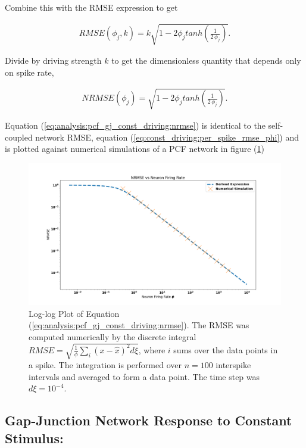 Combine this with the RMSE expression to get 

\begin{align*}
RMSE(\phi_j, k) = 
k \sqrt{
	1 - 2 \phi_j tanh \left(\frac{1}{2 \, \phi_j} \right)
}. 
\end{align*}

Divide by driving strength $k$ to get the dimensionless quantity that depends only on spike rate, 

\begin{align}
\label{eq:analysis:pcf_gj_const_driving:nrmse}
NRMSE(\phi_j) = 
\sqrt{
	1 - 2 \phi_j tanh \left(\frac{1}{2 \, \phi_j} \right)
}. 
\end{align}

Equation (\ref{eq:analysis:pcf_gj_const_driving:nrmse}) is identical to the self-coupled network RMSE, equation (\ref{eq:const_driving:per_spike_rmse_phi}) and is plotted against numerical simulations of a PCF network in figure (\ref{fig:const_driving:pcf_nrmse_vs_phi})

\begin{figure}
\centering
\includegraphics[width=\linewidth]{figures/pcf_nrmse_vs_phi}
\caption{Log-log Plot of Equation (\ref{eq:analysis:pcf_gj_const_driving:nrmse}). The RMSE was computed numerically by the discrete integral $RMSE = \sqrt{\frac{1}{\phi} \sum_{i} (x - \hat{x})^2 d\xi}$, where $i$ sums over the data points in a spike. The integration is performed over $n = 100$ interspike intervals and averaged to form a data point. The time step was $d\xi = 10^{-4}$.}
\label{fig:const_driving:pcf_nrmse_vs_phi}
\end{figure}


\subsection{Gap-Junction Network Response to Constant Stimulus:} 

